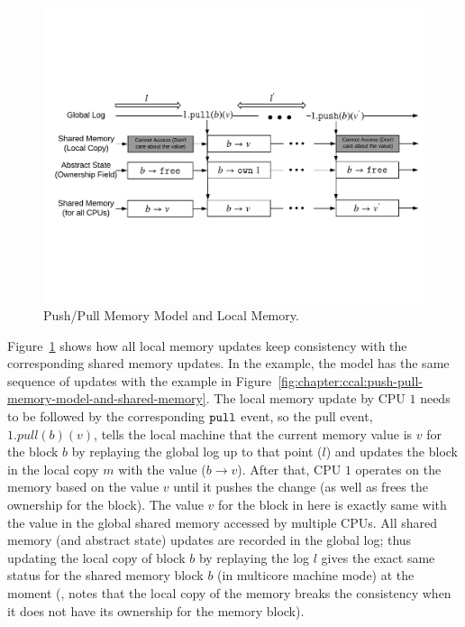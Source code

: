 \begin{figure}
\includegraphics[width=\textwidth]{figs/ccal/pushpullsharedmemorylocal}
\caption{Push/Pull Memory Model and Local Memory.}
\label{fig:chapter:ccal:push-pull-memory-model-and-local-memory}
\end{figure}

Figure~\ref{fig:chapter:ccal:push-pull-memory-model-and-local-memory} shows how
all local memory updates keep consistency with the corresponding shared memory updates. 
In the example, the model has the same sequence of updates with the example 
in Figure~\ref{fig:chapter:ccal:push-pull-memory-model-and-shared-memory}.
The local memory update by CPU $1$ needs to be followed by the corresponding ${\mathrm{\texttt{pull}}}$ event, 
so the pull event, $1.pull(b)(v)$, tells the local machine that the current memory value is 
$v$ for the block $b$ by replaying the global log up to that point ($l$)
and updates the block in the local copy $m$ with the value ($b \rightarrow v$). 
After that, CPU $1$ operates on the memory based on the value $v$ until it pushes the change (as well as frees the ownership for the block).
The value $v$ for the block in here is exactly same with the value in the global shared memory accessed by multiple CPUs. 
All shared memory (and abstract state) updates are recorded in the global log; thus
updating the local copy of block $b$ by replaying the log $l$ gives the exact same status for the shared memory block $b$ (in multicore machine mode) at the moment
(\ie, notes that the local copy of the memory breaks the consistency when it does not have its ownership for the memory block). 


